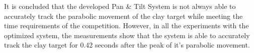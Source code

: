 It is concluded that the developed Pan \& Tilt System
is not always able to accurately track the parabolic movement of the clay target while
meeting the time requirements of the competition.
However, in all the experiments with the optimized system, the measurements show
that the system is able to accurately track the
clay target for 0.42 seconds after the peak of it's parabolic movement.

